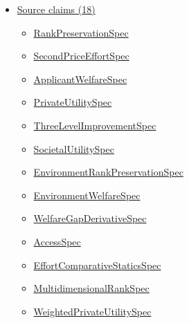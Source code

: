 \documentclass[10pt]{article}
\begin{document}
\begin{itemize}[leftmargin=1.2em]
\begin{itemize}[leftmargin=1.2em]
\item \hyperlink{paper-prerequisite-b2f8283910c81320}{LBG22\allowbreak{}Strategic\allowbreak{}Ranking.\allowbreak{}source\allowbreak{}Group\allowbreak{}Threshold}
\item \hyperlink{paper-prerequisite-366855b73d9ea1c5}{LBG22\allowbreak{}Strategic\allowbreak{}Ranking.\allowbreak{}source\allowbreak{}Pure\allowbreak{}Randomization\allowbreak{}Reward}
\item \hyperlink{paper-prerequisite-7224ad4c7b0b8551}{LBG22\allowbreak{}Strategic\allowbreak{}Ranking.\allowbreak{}source\allowbreak{}Societal\allowbreak{}Utility}
\end{itemize}
\item \hyperlink{source-section-f10b5f68e4acf3dc}{Source claims (18)}
\begin{itemize}[leftmargin=1.2em]
\item \hyperlink{source-claim-a38dac6d1a17c16d}{Rank\allowbreak{}Preservation\allowbreak{}Spec}
\item \hyperlink{source-claim-6f58e02df112a54c}{Second\allowbreak{}Price\allowbreak{}Effort\allowbreak{}Spec}
\item \hyperlink{source-claim-6f73613040867488}{Applicant\allowbreak{}Welfare\allowbreak{}Spec}
\item \hyperlink{source-claim-1ba4d8c13750bf79}{Private\allowbreak{}Utility\allowbreak{}Spec}
\item \hyperlink{source-claim-5cd4797b5f4721de}{Three\allowbreak{}Level\allowbreak{}Improvement\allowbreak{}Spec}
\item \hyperlink{source-claim-f1c09a02beccebed}{Societal\allowbreak{}Utility\allowbreak{}Spec}
\item \hyperlink{source-claim-d14371f504c1d7ee}{Environment\allowbreak{}Rank\allowbreak{}Preservation\allowbreak{}Spec}
\item \hyperlink{source-claim-77aa097e6083e865}{Environment\allowbreak{}Welfare\allowbreak{}Spec}
\item \hyperlink{source-claim-7af287b5fa9fa319}{Welfare\allowbreak{}Gap\allowbreak{}Derivative\allowbreak{}Spec}
\item \hyperlink{source-claim-dcc0514ddd510442}{Access\allowbreak{}Spec}
\item \hyperlink{source-claim-6cc5784dc863c5dc}{Effort\allowbreak{}Comparative\allowbreak{}Statics\allowbreak{}Spec}
\item \hyperlink{source-claim-ed834a4cf517d7fc}{Multidimensional\allowbreak{}Rank\allowbreak{}Spec}
\item \hyperlink{source-claim-ef5c828d0d65c93b}{Weighted\allowbreak{}Private\allowbreak{}Utility\allowbreak{}Spec}

\end{itemize}
\end{itemize}
\end{document}

